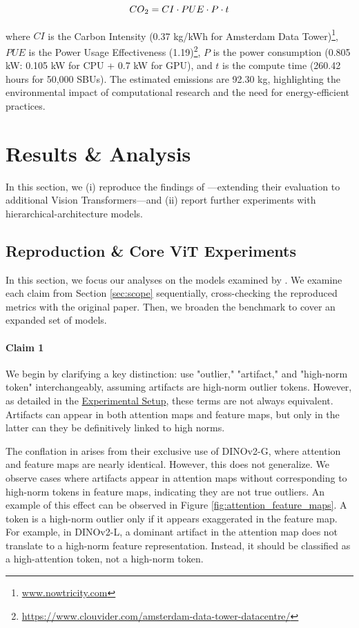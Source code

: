 \documentclass[10pt]{article} \usepackage[preprint]{tmlr}
\begin{document}
\begin{equation}
CO\textsubscript{2} = CI \cdot PUE \cdot P \cdot t
\end{equation}

where \( CI \) is the Carbon Intensity (0.37 kg/kWh for Amsterdam Data Tower)\footnote{\url{www.nowtricity.com}}, \( PUE \) is the Power Usage Effectiveness (1.19)\footnote{\url{https://www.clouvider.com/amsterdam-data-tower-datacentre/}}, \( P \) is the power consumption (0.805 kW: 0.105 kW for CPU + 0.7 kW for GPU), and \( t \) is the compute time (260.42 hours for 50,000 SBUs). The estimated emissions are 92.30 kg, highlighting the environmental impact of computational research and the need for energy-efficient practices.

\section{Results \& Analysis}
\label{sec:results}
In this section, we (i) reproduce the findings of \citet{darcet2024registers}—extending their evaluation to additional Vision Transformers—and (ii) report further experiments with hierarchical-architecture models.

\subsection{Reproduction \& Core ViT Experiments}
\label{subsec:results1}

In this section, we focus our analyses on the models examined by \citet{darcet2024registers}. We examine each claim from Section \ref{sec:scope} sequentially, cross-checking the reproduced metrics with the original paper. Then, we broaden the benchmark to cover an expanded set of models.

\paragraph{Claim 1}

We begin by clarifying a key distinction: \citet{darcet2024registers} use "outlier," "artifact," and "high-norm token" interchangeably, assuming artifacts are high-norm outlier tokens. However, as detailed in the \hyperref[sec:experimental_setup]{Experimental Setup}, these terms are not always equivalent. Artifacts can appear in both attention maps and feature maps, but only in the latter can they be definitively linked to high norms. 

The conflation in \citet{darcet2024registers} arises from their exclusive use of DINOv2-G, where attention and feature maps are nearly identical. However, this does not generalize. We observe cases where artifacts appear in attention maps without corresponding to high-norm tokens in feature maps, indicating they are not true outliers. An example of this effect can be observed in Figure \ref{fig:attention_feature_maps}. A token is a high-norm outlier only if it appears exaggerated in the feature map. For example, in DINOv2-L, a dominant artifact in the attention map does not translate to a high-norm feature representation. Instead, it should be classified as a high-attention token, not a high-norm token.
\end{document}
